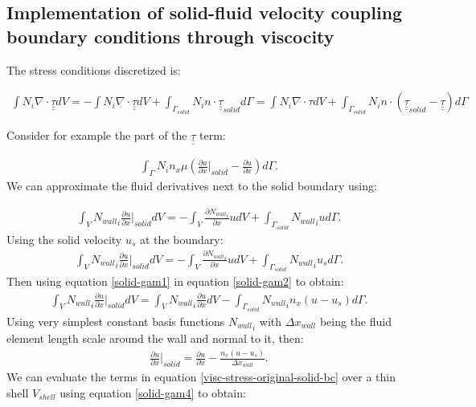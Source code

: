 \subsection{Implementation of solid-fluid velocity coupling boundary conditions through viscocity}


The stress conditions discretized is:

\begin{eqnarray}
\int N_i \nabla \cdot \underline{\underline{\tau}} dV =
-
\int N_i \nabla \cdot \underline{\underline{\tau}} dV
+ \int_{\Gamma_{solid}} N_i n\cdot \underline{\underline{\tau}}_{solid} d\Gamma
=\int N_i \nabla \cdot \tau dV
+ \int_{\Gamma_{solid}} N_i n\cdot (\underline{\underline{\tau}}_{solid} - \underline{\underline{\tau}}) d\Gamma
\label{visc-stress-original}
\end{eqnarray}

Consider for example the part of the $\underline{\underline{\tau}}$ term:

\begin{eqnarray}
\int_\Gamma N_i n_x \mu ( \frac{\partial u}{\partial x}\vert_{solid} - \frac{\partial u}{\partial x} ) d\Gamma.
\label{visc-stress-original-solid-bc}
\end{eqnarray}
We can approximate the fluid derivatives next to the solid boundary using:

\begin{eqnarray}
\int_V {N_{wall}}_i \frac{\partial u}{\partial x} \vert_{solid} dV
=
- \int_V \frac{\partial {N_{wall}}_i }{\partial x} u dV
+\int_{\Gamma_{solid}} {N_{wall}}_i  u d\Gamma.
\label{solid-gam1}
\end{eqnarray}
Using the solid velocity $u_s$ at the boundary:
\begin{eqnarray}
\int_V {N_{wall}}_i \frac{\partial u}{\partial x} \vert_{solid} dV
=
- \int_V \frac{\partial {N_{wall}}_i }{\partial x} u dV
+\int_{\Gamma_{solid}} {N_{wall}}_i  u_s d\Gamma.
\label{solid-gam2}
\end{eqnarray}
Then using equation \ref{solid-gam1} in equation \ref{solid-gam2} to obtain:
\begin{eqnarray}
\int_V {N_{wall}}_i \frac{\partial u}{\partial x} \vert_{solid} dV
= \int_V {N_{wall}}_i \frac{\partial u}{\partial x} dV
-\int_{\Gamma_{solid}} {N_{wall}}_i  n_x (u-u_s) d\Gamma.
\label{solid-gam3}
\end{eqnarray}
Using very simplest constant basis functions ${N_{wall}}_i$ with $\Delta x_{wall}$ being the
fluid element length scale around the wall and normal to it, then:
\begin{eqnarray}
 \frac{\partial u}{\partial x} \vert_{solid}
= \frac{\partial u}{\partial x}
-\frac{ n_x (u-u_s) }{\Delta x_{wall}}.
\label{solid-gam4}
\end{eqnarray}
We can evaluate the terms in equation \ref{visc-stress-original-solid-bc} over a thin shell $V_{shell}$ using equation \ref{solid-gam4} to obtain:

